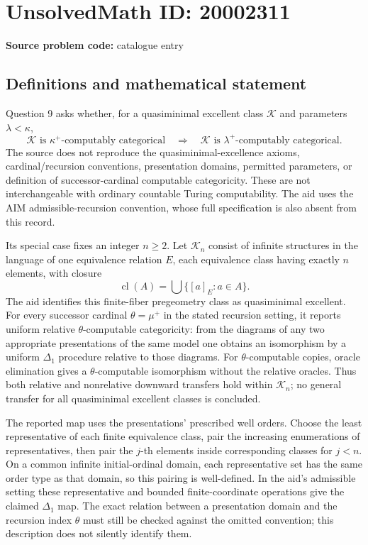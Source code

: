 \documentclass[11pt]{article}
\begin{document}
\section*{UnsolvedMath ID: 20002311}
\textbf{Source problem code:} catalogue entry
\subsection{Definitions and mathematical statement}
Question 9 asks whether, for a quasiminimal excellent class \(\mathcal K\) and parameters \(\lambda<\kappa\),
\[
 \mathcal K\text{ is }\kappa^+\text{-computably categorical}
 \quad\Longrightarrow\quad
 \mathcal K\text{ is }\lambda^+\text{-computably categorical}.
\]
The source does not reproduce the quasiminimal-excellence axioms, cardinal/recursion conventions, presentation domains, permitted parameters, or definition of successor-cardinal computable categoricity. These are not interchangeable with ordinary countable Turing computability. The aid uses the AIM admissible-recursion convention, whose full specification is also absent from this record.

Its special case fixes an integer \(n\ge2\). Let \(\mathcal K_n\) consist of infinite structures in the language of one equivalence relation \(E\), each equivalence class having exactly \(n\) elements, with closure
\[
 \operatorname{cl}(A)=\bigcup\{[a]_E:a\in A\}.
\]
The aid identifies this finite-fiber pregeometry class as quasiminimal excellent. For every successor cardinal \(\theta=\mu^+\) in the stated recursion setting, it reports uniform relative \(\theta\)-computable categoricity: from the diagrams of any two appropriate presentations of the same model one obtains an isomorphism by a uniform \(\Delta_1\) procedure relative to those diagrams. For \(\theta\)-computable copies, oracle elimination gives a \(\theta\)-computable isomorphism without the relative oracles. Thus both relative and nonrelative downward transfers hold within \(\mathcal K_n\); no general transfer for all quasiminimal excellent classes is concluded.

The reported map uses the presentations' prescribed well orders. Choose the least representative of each finite equivalence class, pair the increasing enumerations of representatives, then pair the \(j\)-th elements inside corresponding classes for \(j<n\). On a common infinite initial-ordinal domain, each representative set has the same order type as that domain, so this pairing is well-defined. In the aid's admissible setting these representative and bounded finite-coordinate operations give the claimed \(\Delta_1\) map. The exact relation between a presentation domain and the recursion index \(\theta\) must still be checked against the omitted convention; this description does not silently identify them.
\end{document}
